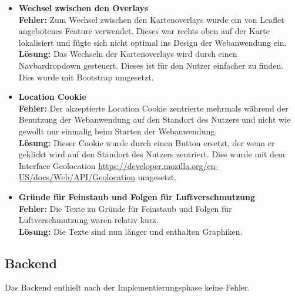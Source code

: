 \begin{itemize}
	\item \textbf{Wechsel zwischen den Overlays}
	\\
	\textbf{Fehler:} Zum Wechsel zwischen den \glspl{Kartenoverlay} wurde ein von \gls{Leaflet} angebotenes Feature verwendet. Dieses war rechts oben auf der Karte lokalisiert und fügte sich nicht optimal ins Design der Webanwendung ein.
	\\
	\textbf{Lösung:} Das Wechseln der \glspl{Kartenoverlay} wird durch einen Navbardropdown gesteuert. Dieses ist für den Nutzer einfacher zu finden. Dies wurde mit \gls{Bootstrap} umgesetzt.
	\item \textbf{Location Cookie}
	\\
	\textbf{Fehler:} Der akzeptierte Location Cookie zentrierte mehrmals während der Benutzung der Webanwendung auf den Standort des Nutzers und nicht wie gewollt nur einmalig beim Starten der Webanwendung.
	\\
	\textbf{Lösung:} Dieser Cookie wurde durch einen Button ersetzt, der wenn er geklickt wird auf den Standort des Nutzers zentriert. Dies wurde mit dem Interface Geolocation \url{https://developer.mozilla.org/en-US/docs/Web/API/Geolocation} umgesetzt.
	\item \textbf{Gründe für Feinstaub und Folgen für Luftverschmutzung}
	\\
	\textbf{Fehler:} Die Texte zu Gr\"unde f\"ur Feinstaub und Folgen für Luftverschmutzung waren relativ kurz.
	\\
	\textbf{Lösung:} Die Texte sind nun länger und enthalten Graphiken.	
\end{itemize}
\subsection{Backend}
Das Backend enthielt nach der Implementierungsphase keine Fehler.
